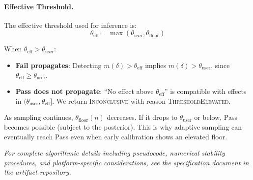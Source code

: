 \paragraph{Effective Threshold.}
The effective threshold used for inference is:
\begin{equation}
\theta_{\text{eff}} = \max(\theta_{\text{user}}, \theta_{\text{floor}})
\end{equation}

When $\theta_{\text{eff}} > \theta_{\text{user}}$:
\begin{itemize}
\item \textbf{Fail propagates}: Detecting $m(\delta) > \theta_{\text{eff}}$ implies $m(\delta) > \theta_{\text{user}}$, since $\theta_{\text{eff}} \geq \theta_{\text{user}}$.
\item \textbf{Pass does not propagate}: ``No effect above $\theta_{\text{eff}}$'' is compatible with effects in $(\theta_{\text{user}}, \theta_{\text{eff}}]$. We return \textsc{Inconclusive} with reason \textsc{ThresholdElevated}.
\end{itemize}

As sampling continues, $\theta_{\text{floor}}(n)$ decreases. If it drops to $\theta_{\text{user}}$ or below, Pass becomes possible (subject to the posterior). This is why adaptive sampling can eventually reach Pass even when early calibration shows an elevated floor.

\vspace{1em}
\noindent\textit{For complete algorithmic details including pseudocode, numerical stability procedures, and platform-specific considerations, see the specification document in the artifact repository.}
